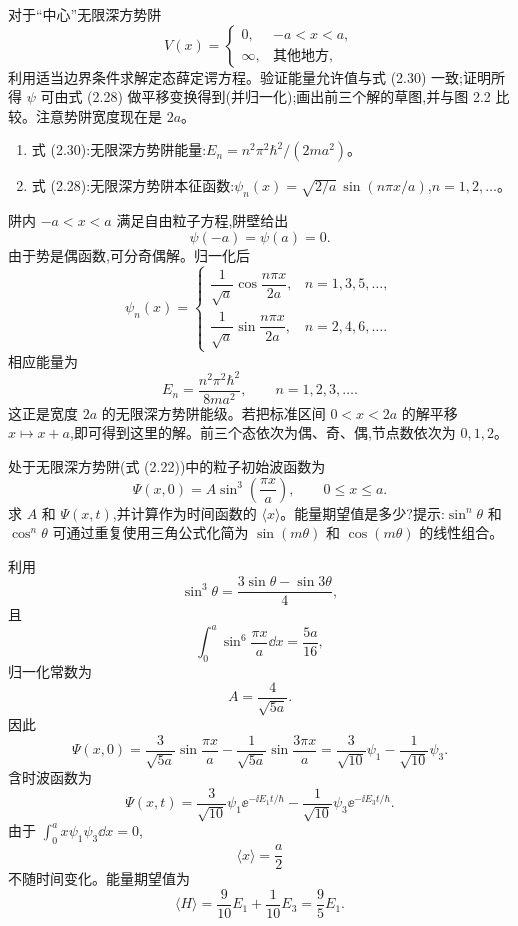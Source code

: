 \begin{question}
对于“中心”无限深方势阱
\[
V(x)=\begin{cases}0,&-a<x<a,\\ \infty,&\text{其他地方},
\end{cases}
\]
利用适当边界条件求解定态薛定谔方程。验证能量允许值与式 (2.30) 一致;证明所得 $\psi$ 可由式 (2.28) 做平移变换得到(并归一化);画出前三个解的草图,并与图 2.2 比较。注意势阱宽度现在是 $2a$。

\par\smallskip
{}
\begin{enumerate}[leftmargin=2.2em,itemsep=0.12em,topsep=0.12em,parsep=0pt]
\item 式 (2.30):无限深方势阱能量:$E_n=n^2\pi^2\hbar^2/(2ma^2)$。
\item 式 (2.28):无限深方势阱本征函数:$\psi_n(x)=\sqrt{2/a}\,\sin(n\pi x/a)$,$n=1,2,\ldots$。
\end{enumerate}

\begin{solution}
阱内 $-a<x<a$ 满足自由粒子方程,阱壁给出
\[
\psi(-a)=\psi(a)=0.
\]
由于势是偶函数,可分奇偶解。归一化后
\[
\psi_n(x)=\begin{cases}
\dfrac1{\sqrt a}\cos\dfrac{n\pi x}{2a},& n=1,3,5,\ldots,\\[0.8em]
\dfrac1{\sqrt a}\sin\dfrac{n\pi x}{2a},& n=2,4,6,\ldots.
\end{cases}
\]
相应能量为
\[
E_n=\frac{n^2\pi^2\hbar^2}{8ma^2},
\qquad n=1,2,3,\ldots.
\]
这正是宽度 $2a$ 的无限深方势阱能级。若把标准区间 $0<x<2a$ 的解平移 $x\mapsto x+a$,即可得到这里的解。前三个态依次为偶、奇、偶,节点数依次为 $0,1,2$。
\end{solution}
\end{question}

\begin{question}
处于无限深方势阱(式 (2.22))中的粒子初始波函数为
\[
\Psi(x,0)=A\sin^3\left(\frac{\pi x}{a}\right),\qquad 0\le x\le a.
\]
求 $A$ 和 $\Psi(x,t)$,并计算作为时间函数的 $\langle x\rangle$。能量期望值是多少?提示:$\sin^n\theta$ 和 $\cos^n\theta$ 可通过重复使用三角公式化简为 $\sin(m\theta)$ 和 $\cos(m\theta)$ 的线性组合。

\par\smallskip
{}

\begin{solution}
利用
\[
\sin^3\theta=\frac{3\sin\theta-\sin3\theta}{4},
\]
且
\[
\int_0^a\sin^6\frac{\pi x}{a}\dd x=\frac{5a}{16},
\]
归一化常数为
\[
A=\frac4{\sqrt{5a}}.
\]
因此
\[
\Psi(x,0)=\frac{3}{\sqrt{5a}}\sin\frac{\pi x}{a}-\frac1{\sqrt{5a}}\sin\frac{3\pi x}{a}
=\frac3{\sqrt{10}}\psi_1-\frac1{\sqrt{10}}\psi_3.
\]
含时波函数为
\[
\Psi(x,t)=\frac3{\sqrt{10}}\psi_1\ee^{-\ii E_1t/\hbar}
-\frac1{\sqrt{10}}\psi_3\ee^{-\ii E_3t/\hbar}.
\]
由于 $\int_0^a x\psi_1\psi_3\dd x=0$,
\[
\langle x\rangle=\frac{a}{2}
\]
不随时间变化。能量期望值为
\[
\langle H\rangle=\frac9{10}E_1+\frac1{10}E_3
=\frac95E_1.
\]
\end{solution}
\end{question}

